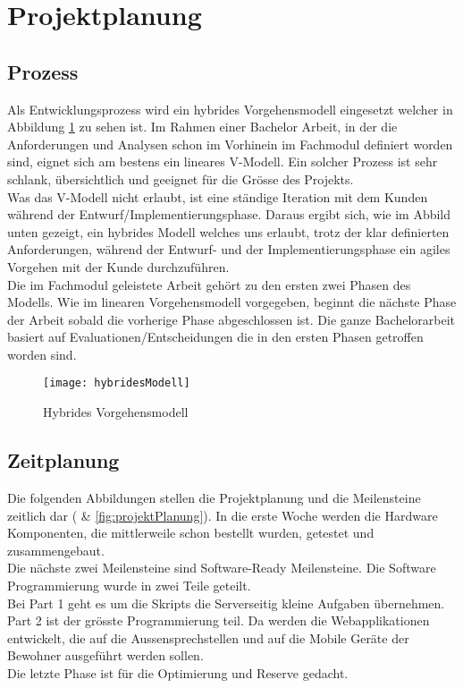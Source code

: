 \section{Projektplanung}
\label{sec:chapterexample}

\subsection{Prozess}
\label{sec:chapterexample}

Als Entwicklungsprozess wird ein hybrides Vorgehensmodell eingesetzt welcher in Abbildung \ref{fig:hybridesModell} zu sehen ist. Im Rahmen einer Bachelor Arbeit, in der die Anforderungen und Analysen schon im Vorhinein im Fachmodul definiert worden sind, eignet sich am bestens ein lineares V-Modell. Ein solcher Prozess ist sehr schlank, übersichtlich und geeignet für die Grösse des Projekts.
\\
Was das V-Modell nicht erlaubt, ist eine ständige Iteration mit dem Kunden während der Entwurf/Implementierungsphase. Daraus ergibt sich, wie im Abbild unten gezeigt, ein hybrides Modell welches uns erlaubt, trotz der klar definierten Anforderungen, während der Entwurf- und der Implementierungsphase ein agiles Vorgehen mit der Kunde durchzuführen.
\\
Die im Fachmodul geleistete Arbeit gehört zu den ersten zwei Phasen des Modells. Wie im linearen Vorgehensmodell vorgegeben, beginnt die nächste Phase der Arbeit sobald die vorherige Phase abgeschlossen ist. Die ganze Bachelorarbeit basiert auf Evaluationen/Entscheidungen die in den ersten Phasen getroffen worden sind.  

\begin{figure}[htb!]
	\begin{center}
		\texttt{[image: hybridesModell]}
		\caption[Hybrides Vorgehensmodell]{Hybrides Vorgehensmodell}
		\label{fig:hybridesModell}
	\end{center}
\end{figure}


\subsection{Zeitplanung}
\label{sec:zeitplanung}

Die folgenden Abbildungen stellen die Projektplanung und die Meilensteine zeitlich dar ( \& \cref{fig:projektPlanung}). In die erste Woche werden die Hardware Komponenten, die mittlerweile schon bestellt wurden, getestet und zusammengebaut.
\\
Die nächste zwei Meilensteine sind Software-Ready Meilensteine. Die Software Programmierung wurde in zwei Teile geteilt.
\\ 
Bei Part 1 geht es um die Skripts die Serverseitig kleine Aufgaben übernehmen. Part 2 ist der grösste Programmierung teil. Da werden die Webapplikationen entwickelt, die auf die Aussensprechstellen und auf die Mobile Geräte der Bewohner ausgeführt werden sollen.
\\
Die letzte Phase ist für die Optimierung und Reserve gedacht.

